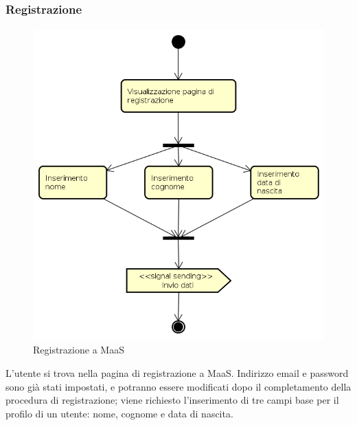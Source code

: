 \subsubsection{Registrazione}
\begin{figure}[H]
\begin{center}
\includegraphics[height=12cm]{res/sections/backend/activities/registrazione.png}
\caption{Registrazione a MaaS}
\end{center}
\end{figure}
L'utente si trova nella pagina di registrazione a MaaS. Indirizzo email e password sono già stati impostati, e potranno essere modificati dopo il completamento della procedura di registrazione; viene richiesto l'inserimento di tre campi base per il profilo di un utente: nome, cognome e data di nascita.
